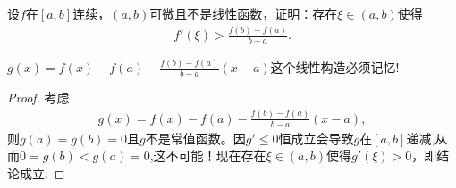 \documentclass[../../main.tex]{subfiles}%
\begin{document}
\begin{example}
设$f$在$[a,b]$连续，$(a,b)$可微且不是线性函数，证明：存在$\xi\in(a,b)$使得
\begin{align*}
f'(\xi) > \frac{f(b) - f(a)}{b - a}.
\end{align*}
\end{example}
\begin{note}
$g(x) = f(x) - f(a)- \frac{f(b) - f(a)}{b - a}(x - a)$这个线性构造必须记忆!
\end{note}
\begin{proof}

考虑
\begin{align*}
g(x) = f(x) - f(a)- \frac{f(b) - f(a)}{b - a}(x - a) ,
\end{align*}
则$g(a) = g(b) = 0$且$g$不是常值函数。因$g'\leqslant  0$恒成立会导致$g$在$[a,b]$递减,从而$0=g(b)<g(a)=0$,这不可能！现在存在$\xi\in(a,b)$使得$g'(\xi) > 0$，即结论成立.

\end{proof}
\end{document}
